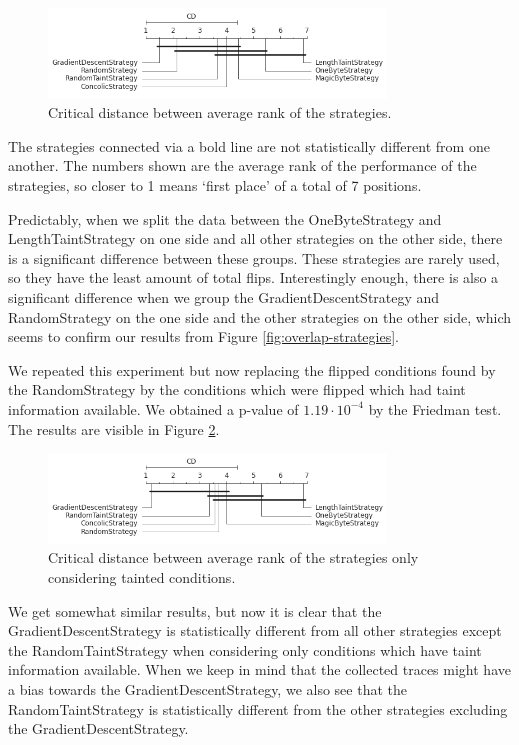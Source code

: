 \begin{figure}[H]
    \centering
    \includegraphics[width=0.8\textwidth]{5_results/graphs_new/cd_strategies.png}  
    \caption{Critical distance between average rank of the strategies.}
    \label{fig:cd-strategies}
\end{figure}

The strategies connected via a bold line are not statistically different from one another. The numbers shown are the average rank of the performance of the strategies, so closer to 1 means `first place' of a total of 7 positions.

Predictably, when we split the data between the OneByteStrategy and LengthTaintStrategy on one side and all other strategies on the other side, there is a significant difference between these groups. These strategies are rarely used, so they have the least amount of total flips. 
Interestingly enough, there is also a significant difference when we group the GradientDescentStrategy and RandomStrategy on the one side and the other strategies on the other side, which seems to confirm our results from Figure \ref{fig:overlap-strategies}.

We repeated this experiment but now replacing the flipped conditions found by the RandomStrategy by the conditions which were flipped which had taint information available. We obtained a p-value of $1.19 \cdot 10^{-4}$ by the Friedman test. The results are visible in Figure \ref{fig:cd-strategies-with-taint}.
\begin{figure}[H]
    \centering
    \includegraphics[width=0.8\textwidth]{5_results/graphs_new/cd_strategies_with_offset.png}  
    \caption{Critical distance between average rank of the strategies only considering tainted conditions.}
    \label{fig:cd-strategies-with-taint}
\end{figure}
We get somewhat similar results, but now it is clear that the GradientDescentStrategy is statistically different from all other strategies except the RandomTaintStrategy when considering only conditions which have taint information available. When we keep in mind that the collected traces might have a bias towards the GradientDescentStrategy, we also see that the RandomTaintStrategy is statistically different from the other strategies excluding the GradientDescentStrategy.

